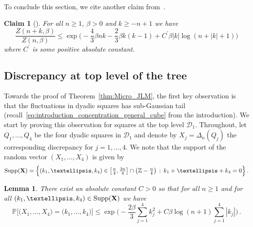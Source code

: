 \documentclass[11pt]{amsart}
\newtheorem{lemma}[theorem]{Lemma}
\newtheorem{claim}[theorem]{Claim}
\theoremstyle{definition}
\theoremstyle{remark}
\numberwithin{equation}{section}
\newcommand{\bZ}{\mathbb Z}
\newcommand{\bP}{\mathbb P}
\begin{document}
	To conclude this section, we cite another claim from~\cite{chatterjee}. 
	\begin{claim}[{\cite[Corollary~3.4]{chatterjee}}]
		\label{claim:bound_on_ratio_of_partitions}
		For all $n\ge 1$, $\beta>0$ and $k\ge -n+1$ we have
		\[
		\frac{Z(n+k,\beta)}{Z(n,\beta)} \le \exp\bigg(-\frac{4}{3} \beta n k - \frac{2}{3}\beta k(k-1) + C^\prime \beta|k|\log(n+|k|+1)\bigg)
		\]
		where $C^\prime$ is some positive absolute constant.
	\end{claim}
	\subsection{Discrepancy at top level of the tree}
	Towards the proof of Theorem~\ref{thm:Micro_JLM}, the first key observation is that the fluctuations in dyadic squares has sub-Gaussian tail (recall~\eqref{eq:introduction_concentration_general_cube} from the introduction). We start by proving this observation for squares at the top level $\mathcal{D}_1$. Throughout, let $Q_1,\ldots,Q_4$ be the four dyadic squares in $\mathcal{D}_1$ and denote by $X_j = \Delta_n(Q_j)$ the corresponding discrepancy for $j=1,\ldots,4$. We note that the support of the random vector $(X_1,\ldots,X_4)$ is given by
	\begin{equation}
		\label{eq:support_of_top_level_disc}
		\text{Supp}({\bf X}) = \Big\{(k_1,\ldots,k_4) \in \big[\tfrac{n}{4},\tfrac{3n}{4}\big] \cap \big(\bZ-\tfrac{n}{4}\big) \, : \, k_1+\ldots+k_4 = 0 \Big\} \, .
	\end{equation}
	\begin{lemma}
		\label{lemma:tail_probability_for_disc_at_top_level}
		There exist an absolute constant $C>0$ so that for all $n\ge 1$ and for all $(k_1,\ldots,k_4)\in\text{\normalfont Supp}({\bf X})$ we have
		\begin{equation*}
			\bP\Big[\big(X_1,\ldots,X_4\big) = \big(k_1,\ldots,k_4\big)\Big] \le \exp\Big(-\frac{2\beta}{3}\sum_{j=1}^{4} k_j^2 + C\beta \log(n+1) \sum_{j=1}^4 |k_j|\Big)\, .
		\end{equation*}
	\end{lemma}
\end{document}
